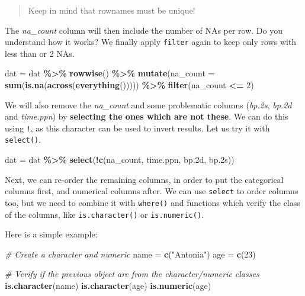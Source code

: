 \documentclass[
]{book}
\newenvironment{Shaded}{\begin{snugshade}}{\end{snugshade}}
\newcommand{\AttributeTok}[1]{\textcolor[rgb]{0.13,0.29,0.53}{#1}}
\newcommand{\CommentTok}[1]{\textcolor[rgb]{0.56,0.35,0.01}{\textit{#1}}}
\newcommand{\DecValTok}[1]{\textcolor[rgb]{0.00,0.00,0.81}{#1}}
\newcommand{\FloatTok}[1]{\textcolor[rgb]{0.00,0.00,0.81}{#1}}
\newcommand{\FunctionTok}[1]{\textcolor[rgb]{0.13,0.29,0.53}{\textbf{#1}}}
\newcommand{\NormalTok}[1]{#1}
\newcommand{\OtherTok}[1]{\textcolor[rgb]{0.56,0.35,0.01}{#1}}
\newcommand{\SpecialCharTok}[1]{\textcolor[rgb]{0.81,0.36,0.00}{\textbf{#1}}}
\newcommand{\StringTok}[1]{\textcolor[rgb]{0.31,0.60,0.02}{#1}}
\begin{document}
\begin{quote}
Keep in mind that rownames must be unique!
\end{quote}

The \emph{na\_count} column will then include the number of NAs per row. Do you understand how it works?
We finally apply \texttt{filter} again to keep only rows with less than or 2 NAs.

\begin{Shaded}
\begin{Highlighting}[]
\NormalTok{dat }\OtherTok{=}\NormalTok{ dat }\SpecialCharTok{\%\textgreater{}\%}
  \FunctionTok{rowwise}\NormalTok{() }\SpecialCharTok{\%\textgreater{}\%}
  \FunctionTok{mutate}\NormalTok{(}\AttributeTok{na\_count =} \FunctionTok{sum}\NormalTok{(}\FunctionTok{is.na}\NormalTok{(}\FunctionTok{across}\NormalTok{(}\FunctionTok{everything}\NormalTok{())))) }\SpecialCharTok{\%\textgreater{}\%}
  \FunctionTok{filter}\NormalTok{(na\_count }\SpecialCharTok{\textless{}=} \DecValTok{2}\NormalTok{)}
\end{Highlighting}
\end{Shaded}

We will also remove the \emph{na\_count} and some problematic columns (\emph{bp.2s}, \emph{bp.2d} and \emph{time.ppn}) by \textbf{selecting the ones which are not these}. We can do this using \texttt{!}, as this character can be used to invert results. Let us try it with \texttt{select()}.

\begin{Shaded}
\begin{Highlighting}[]
\NormalTok{dat }\OtherTok{=}\NormalTok{ dat }\SpecialCharTok{\%\textgreater{}\%}
  \FunctionTok{select}\NormalTok{(}\SpecialCharTok{!}\FunctionTok{c}\NormalTok{(na\_count, time.ppn, bp}\FloatTok{.2}\NormalTok{d, bp}\FloatTok{.2}\NormalTok{s))}
\end{Highlighting}
\end{Shaded}

Next, we can re-order the remaining columns, in order to put the categorical columns first, and numerical columns after. We can use \texttt{select} to order columns too, but we need to combine it with \texttt{where()} and functions which verify the class of the columns, like \texttt{is.character()} or \texttt{is.numeric()}.

Here is a simple example:

\begin{Shaded}
\begin{Highlighting}[]
\CommentTok{\# Create a character and numeric }
\NormalTok{name }\OtherTok{=} \FunctionTok{c}\NormalTok{(}\StringTok{"Antonia"}\NormalTok{)}
\NormalTok{age }\OtherTok{=} \FunctionTok{c}\NormalTok{(}\DecValTok{23}\NormalTok{)}

\CommentTok{\# Verify if the previous object are from the character/numeric classes}
\FunctionTok{is.character}\NormalTok{(name)}
\FunctionTok{is.character}\NormalTok{(age)}
\FunctionTok{is.numeric}\NormalTok{(age)}
\end{Highlighting}
\end{Shaded}
\end{document}
